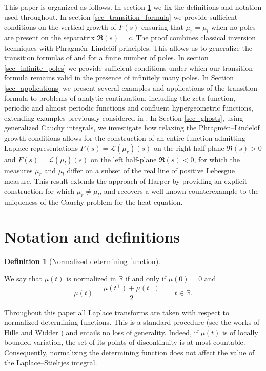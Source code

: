 \documentclass[12pt]{article}
\theoremstyle{definition}
\newtheorem{definition}[theorem]{Definition}
\begin{document}
This paper is organized as follows. 
In section \ref{sec_definitions} we fix the definitions and notation used throughout. In section \ref{sec_transition_formula} we provide sufficient conditions on the vertical growth of \( F(s) \) ensuring that \( \mu_r = \mu_l \) when no poles are present on the separatrix \( \Re ( s) = c \). The proof combines classical inversion techniques with Phragmén--Lindelöf principles. This allows us to generalize the transition formulas of \cite{VanderPol} and \cite{BuescuPolar} for a finite number of poles. In section \ref{sec_infinite_poles} we provide sufficient conditions under which our transition formula remains valid in the presence of infinitely many poles. 
In Section \ref{sec_applications} we present several examples and applications of the transition formula to problems of analytic continuation, including the zeta function, periodic and almost periodic functions and confluent hypergeometric functions, extending examples previously considered in \cite{BuescuPolar}.
In Section \ref{sec_ghosts}, using generalized Cauchy integrals, we investigate how relaxing the Phragmén--Lindelöf growth conditions allows for the construction of an entire function admitting Laplace representations $F(s)=\mathcal{L}(\mu_r)(s)$ on the right half-plane $\Re(s)>0$ and $F(s)=\mathcal{L}(\mu_l)(s)$ on the left half-plane $\Re(s)<0$, for which the measures $\mu_r$ and $\mu_l$ differ on a subset of the real line of positive Lebesgue measure. This result extends the approach of Harper \cite{Harper} by providing an explicit construction for which $\mu_r \neq \mu_l$, and recovers a well-known counterexample to the uniqueness of the Cauchy problem for the heat equation.



\section{Notation and definitions}
\label{sec_definitions}

\begin{definition}[Normalized determining function]
\label{def_normalized}

\noindent We say that $\mu(t)$ is normalized in $\mathbb{R}$ if and only if $\mu(0)=0$ and \begin{equation*}
    \mu(t)= \frac{\mu(t^+)+ \mu(t^-)}{2} \qquad t \in \mathbb{R}.
\end{equation*}
    
\end{definition}
Throughout this paper all Laplace transforms are taken with respect to normalized determining functions. This is a standard procedure  (see the works of Hille and Widder \cite{ HilleMoment, Widder}) and entails no loss of generality. Indeed, if \( \mu(t) \) is of locally  bounded variation, the set of its points of discontinuity is at most countable. Consequently, normalizing the determining function does not affect the value of the Laplace--Stieltjes integral. 
\end{document}
